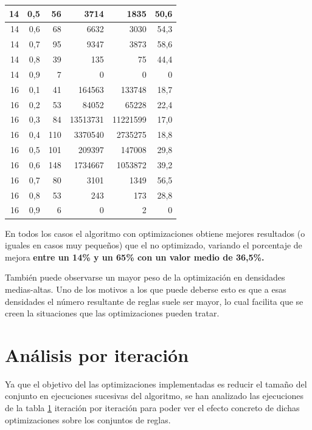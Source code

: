 \begin{table}[htbp]
\begin{center}
\begin{tabular}{|r|r|r|r|r|r|}
				14 & 0,5 & 56 & 3714 & 1835 & 50,6 \\ \hline
				14 & 0,6 & 68 & 6632 & 3030 & 54,3 \\ \hline
				14 & 0,7 & 95 & 9347 & 3873 & 58,6 \\ \hline
				14 & 0,8 & 39 & 135 & 75 & 44,4 \\ \hline
				14 & 0,9 & 7 & 0 & 0 & 0 \\ \hline
				16 & 0,1 & 41 & 164563 & 133748 & 18,7 \\ \hline
				16 & 0,2 & 53 & 84052 & 65228 & 22,4 \\ \hline
				16 & 0,3 & 84 & 13513731 & 11221599 & 17,0 \\ \hline
				16 & 0,4 & 110 & 3370540 & 2735275 & 18,8 \\ \hline
				16 & 0,5 & 101 & 209397 & 147008 & 29,8 \\ \hline
				16 & 0,6 & 148 & 1734667 & 1053872 & 39,2 \\ \hline
				16 & 0,7 & 80 & 3101 & 1349 & 56,5 \\ \hline
				16 & 0,8 & 53 & 243 & 173 & 28,8 \\ \hline
				16 & 0,9 & 6 & 0 & 2 & 0 \\ \hline
			\end{tabular}
		\end{center}
		\label{tiempos_totales}
	\end{table}

	En todos los casos el algoritmo con optimizaciones obtiene mejores resultados (o iguales en casos muy pequeños) que el no optimizado, variando el porcentaje de mejora \textbf{entre un 14\% y un 65\% con un valor medio de 36,5\%.}
	
	También puede observarse un mayor peso de la optimización en densidades medias-altas. Uno de los motivos a los que puede deberse esto es que a esas densidades el número resultante de reglas suele ser mayor, lo cual facilita que se creen la situaciones que las optimizaciones pueden tratar. 
	\newpage
	
\section*{Análisis por iteración}

	Ya que el objetivo del las optimizaciones implementadas es reducir el tamaño del conjunto en ejecuciones sucesivas del algoritmo, se han analizado las ejecuciones de la tabla \ref{tiempos_totales} iteración por iteración para poder ver el efecto concreto de dichas optimizaciones sobre los conjuntos de reglas.
	
